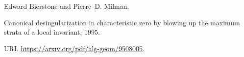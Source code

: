 Edward Bierstone and Pierre~D. Milman.

\newblock Canonical desingularization in characteristic zero by blowing up the
  maximum strata of a local invariant, 1995.

\newblock URL \url{https://arxiv.org/pdf/alg-geom/9508005}.

